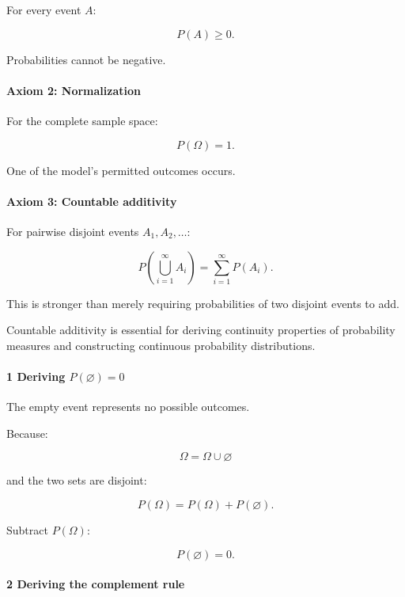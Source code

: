 For every event \(A\):

\[
 \boxed{P(A)\ge0}.
\]

Probabilities cannot be negative.

\paragraph{Axiom 2: Normalization}\label{axiom-2-normalization}

For the complete sample space:

\[
 \boxed{P(\Omega)=1}.
\]

One of the model's permitted outcomes occurs.

\paragraph{Axiom 3: Countable additivity}\label{axiom-3-countable-additivity}

For pairwise disjoint events \(A_1,A_2,\ldots\):

\[
 \boxed{ P\left(\bigcup_{i=1}^{\infty}A_i\right) = \sum_{i=1}^{\infty}P(A_i) }.
\]

This is stronger than merely requiring probabilities of two disjoint events to add.

Countable additivity is essential for deriving continuity properties of probability measures and constructing continuous probability distributions.

\paragraph{\texorpdfstring{1 Deriving \(P(\varnothing)=0\)}{1 Deriving P(\textbackslash varnothing)=0}}\label{deriving-pvarnothing0}

The empty event represents no possible outcomes.

Because:

\[
 \Omega=\Omega\cup\varnothing
\]

and the two sets are disjoint:

\[
 P(\Omega)=P(\Omega)+P(\varnothing).
\]

Subtract \(P(\Omega)\):

\[
 \boxed{P(\varnothing)=0}.
\]

\paragraph{2 Deriving the complement rule}\label{deriving-the-complement-rule}

